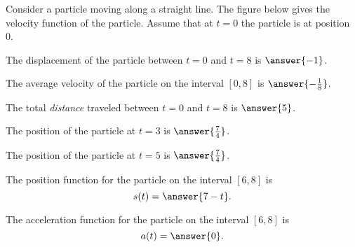 \documentclass{ximera}
\author{Nela Lakos \and Kyle Parsons}
\begin{document}
\begin{exercise}

Consider a particle moving along a straight line.  The figure below gives the velocity function of the particle.  Assume that at $t=0$ the particle is at position 0.

\begin{image}
\end{image}

The displacement of the particle between $t=0$ and $t=8$ is $\answer{-1}$.

The average velocity of the particle on the interval $[0,8]$ is $\answer{-\frac{1}{8}}$.

The total \emph{distance} traveled between $t=0$ and $t=8$ is $\answer{5}$.

The position of the particle at $t=3$ is $\answer{\frac{7}{4}}$.

The position of the particle at $t=5$ is $\answer{\frac{7}{4}}$.

The position function for the particle on the interval $[6,8]$ is
\[
s(t) = \answer{7-t}.
\]

The acceleration function for the particle on the interval $[6,8]$ is
\[
a(t) = \answer{0}.
\]

\end{exercise}
\end{document}
